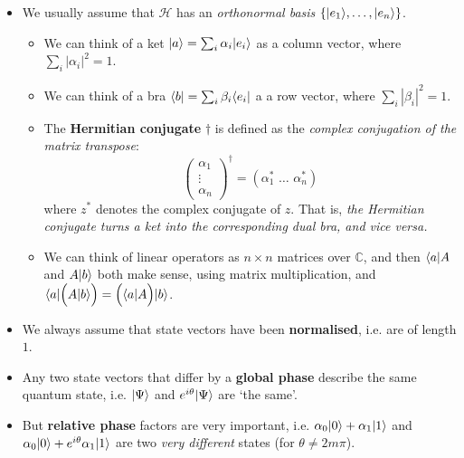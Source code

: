 \documentclass[10pt]{article}
\DeclarePairedDelimiter\bra{\langle}{\rvert}
\DeclarePairedDelimiter\ket{\lvert}{\rangle}
\newcommand{\cc}{\mathbb{C}}
\newcommand{\hilb}{\mathcal{H}}
\begin{document}
            \begin{itemize}
                \item We usually assume that $\hilb$ has an \emph{orthonormal basis} $\{\ket{e_1},\ldots,\ket{e_n}\}$.
                    \begin{itemize}
                        \item We can think of a ket $\ket{a}=\sum_i\alpha_i \ket{e_i}$ as a column vector, where $\sum_i|\alpha_i|^2=1$.
                        \item We can think of a bra $\bra{b}=\sum_i\beta_i \bra{e_i}$ a a row vector, where $\sum_i|\beta_i|^2=1$.
                        \item The \textbf{Hermitian conjugate} $\dagger$ is defined as the \emph{complex conjugation of the matrix transpose}:
                        \begin{equation*}
                            \left(
                            \begin{array}{c}
                                \alpha_1\\
                                \vdots\\
                                \alpha_n
                            \end{array}
                            \right)^\dagger = (\alpha_1^*\,\,\ldots\,\,\alpha_n^*)
                        \end{equation*}
                        where $z^*$ denotes the complex conjugate of $z$.
                        That is, \emph{the Hermitian conjugate turns a ket into the corresponding dual bra, and vice versa.}
                    \item We can think of linear operators as $n\times n$ matrices over $\cc$, and then $\bra{a}A$ and $A\ket{b}$ both make sense, using matrix multiplication, and $\bra{a}\Big(A\ket{b}\Big)=\Big(\bra{a}A\Big)\ket{b}$.
                    \end{itemize}
                \item We always assume that state vectors have been \textbf{normalised}, i.e. are of length $1$.
                \item Any two state vectors that differ by a \textbf{global phase} describe the same quantum state, i.e. $\ket{\Psi}$ and $e^{i\theta}\ket{\Psi}$ are `the same'.
                \item But \textbf{relative phase} factors are very important, i.e. $\alpha_0\ket{0}+\alpha_1\ket{1}$ and $\alpha_0\ket{0}+e^{i\theta}\alpha_1\ket{1}$ are two \emph{very different} states (for $\theta\neq2m\pi$).

\end{itemize}
\end{document}
